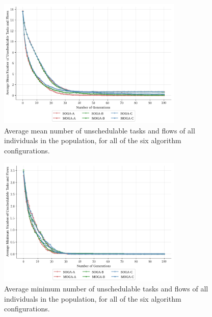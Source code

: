 \documentclass[10pt,conference]{IEEEtran}
\begin{document}
\begin{figure}[!ht]
  \centering
  \includegraphics*[width=8.8cm,keepaspectratio]{fig/results-avg-unschedulable-tasks-flows}
\vspace{-5ex}
  \caption{Average mean number of unschedulable tasks and flows of all individuals in the population, for all of the six algorithm configurations.}
  \label{fig:results-avg-unschedulable-tasks-flows}
\vspace{-2.5ex}
\end{figure}

\begin{figure}[!ht]
  \centering
  \includegraphics*[width=8.8cm,keepaspectratio]{fig/results-min-unschedulable-tasks-flows}
\vspace{-4ex}
  \caption{Average minimum number of unschedulable tasks and flows of all individuals in the population, for all of the six algorithm configurations.}
  \label{fig:results-min-unschedulable-tasks-flows}
\vspace{-3ex}
\end{figure}
\end{document}
